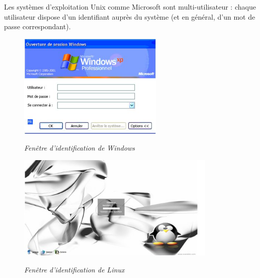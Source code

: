 \documentclass[10pt,fleqn]{article} %
\begin{document}
Les systèmes d'exploitation Unix comme Microsoft sont multi-utilisateur : chaque utilisateur
dispose d'un identifiant auprès du système (et en général, d’un mot de passe correspondant).

\begin{figure}[h]
\begin{minipage}[c]{.49\linewidth}
\begin{center}
\includegraphics[height=5cm]{images/loginWin.jpg}

\textit{Fenêtre d'identification de Windows}
\end{center}
\end{minipage} \hfill
\begin{minipage}[c]{.49\linewidth}
\begin{center}
\includegraphics[height=5cm]{images/loginLin.jpg}

\textit{Fenêtre d'identification de Linux}
\end{center}
\end{minipage}
\end{figure}

%
%
%
%
\end{document}
